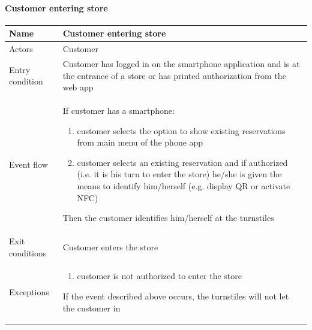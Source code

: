 \paragraph{Customer entering store}
\begin{flushleft}
	\begin{tabular} { | m{3cm} | m{10cm} | }
		\hline
		Name & Customer entering store\\
		\hline
		Actors & Customer\\
		\hline
		Entry condition & Customer has logged in on the smartphone application and is at the entrance of a store or has printed authorization from the web app\\
		\hline
		Event flow &
		If customer has a smartphone:
		\begin{enumerate}
			\item customer selects the option to show existing reservations from main menu of the phone app 
			\item customer selects an existing reservation and if authorized (i.e. it is his turn to enter the store) he/she is given the means to identify him/herself (e.g. display QR or activate NFC)
		\end{enumerate}
		Then the customer identifies him/herself at the turnstiles\\
		\hline
		Exit conditions & Customer enters the store\\
		\hline
		Exceptions & \begin{enumerate}
			\item customer is not authorized to enter the store
		\end{enumerate}
		If the event described above occurs, the turnstiles will not let the customer in\\
		\hline
	\end{tabular}
\end{flushleft}

